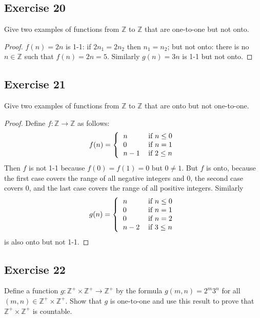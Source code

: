 \documentclass[14pt]{extarticle}
\newcommand{\Z}{\mathbb{Z}}
\begin{document}
\subsection{Exercise 20}
Give two examples of functions from $\Z$ to $\Z$ that are one-to-one but not onto.

\begin{proof}
    \(f(n) = 2n\) is 1-1: if \(2n_1 = 2n_2\) then \(n_1 = n_2\); but not onto:
    there is no \(n \in \Z\) such that \(f(n) = 2n = 5\).
    Similarly \(g(n) = 3n\) is 1-1 but not onto.
\end{proof}

\subsection{Exercise 21}
Give two examples of functions from $\Z$ to $\Z$ that are onto but not one-to-one.

\begin{proof}
    Define \(f: \Z \to \Z\) as follows:
    \[
        f(n) =
        \left\{
        \begin{tabular}{ll}
            \(n\)   & if \(n \leq 0\) \\
            \(0\)   & if \(n = 1\)    \\
            \(n-1\) & if \(2 \leq n\)
        \end{tabular}
        \right.
    \]
    Then $f$ is not 1-1 because \(f(0) = f(1) = 0\) but \(0 \neq 1\). But $f$ is onto, because the first case covers
    the range of all negative integers and 0, the second case covers 0, and the last case covers the range of all positive integers. Similarly
    \[
        g(n) =
        \left\{
        \begin{tabular}{ll}
            \(n\)   & if \(n \leq 0\) \\
            \(0\)   & if \(n = 1\)    \\
            \(0\)   & if \(n = 2\)    \\
            \(n-2\) & if \(3 \leq n\)
        \end{tabular}
        \right.
    \]
    is also onto but not 1-1.
\end{proof}

\subsection{Exercise 22}
Define a function \(g: \Z^+ \times \Z^+ \to \Z^+\) by the formula \(g(m, n) = 2^m3^n\) for all \((m, n) \in \Z^+
\times \Z^+\). Show that $g$ is one-to-one and use this result to prove that \(\Z^+ \times \Z^+\) is countable.
\end{document}
